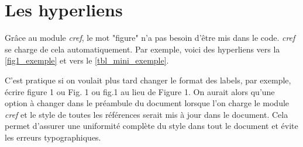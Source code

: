\documentclass[exemple_master.tex]{subfiles}
\begin{document}
\section{Les hyperliens}

Grâce au module \emph{cref}, le mot "figure" n'a pas besoin d'être mis dans le code. \emph{cref} se charge de cela automatiquement. Par exemple, voici des hyperliens vers la \cref{fig1_exemple} et vers le \cref{tbl_mini_exemple}.

C'est pratique si on voulait plus tard changer le format des labels, par exemple, écrire figure 1 ou Fig. 1 ou fig.1 au lieu de Figure 1. On aurait alors qu'une option à changer dans le préambule du document lorsque l'on charge le module \emph{cref} et le style de toutes les références serait mis à jour dans le document. Cela permet d'assurer une uniformité complète du style dans tout le document et évite les erreurs typographiques.
\end{document}
